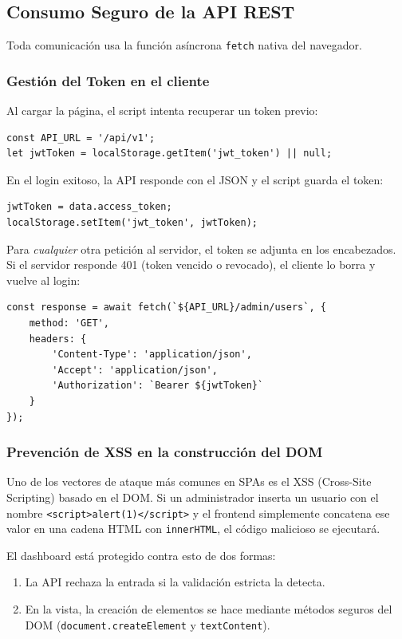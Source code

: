 \subsection{Consumo Seguro de la API REST}
Toda comunicación usa la función asíncrona \texttt{fetch} nativa del navegador.

\subsubsection{Gestión del Token en el cliente}
Al cargar la página, el script intenta recuperar un token previo:
\begin{lstlisting}[language={}, caption={Inicialización del token JWT}]
const API_URL = '/api/v1';
let jwtToken = localStorage.getItem('jwt_token') || null;
\end{lstlisting}
En el login exitoso, la API responde con el JSON y el script guarda el token:
\begin{lstlisting}[language={}, caption={Almacenamiento local del token}]
jwtToken = data.access_token;
localStorage.setItem('jwt_token', jwtToken);
\end{lstlisting}
Para \emph{cualquier} otra petición al servidor, el token se adjunta en los encabezados. Si el servidor responde 401 (token vencido o revocado), el cliente lo borra y vuelve al login:
\begin{lstlisting}[language={}, caption={Envío del token en la lectura de usuarios}]
const response = await fetch(`${API_URL}/admin/users`, {
    method: 'GET',
    headers: {
        'Content-Type': 'application/json',
        'Accept': 'application/json',
        'Authorization': `Bearer ${jwtToken}`
    }
});
\end{lstlisting}

\subsubsection{Prevención de XSS en la construcción del DOM}
Uno de los vectores de ataque más comunes en SPAs es el XSS (Cross-Site Scripting) basado en el DOM. Si un administrador inserta un usuario con el nombre \texttt{<script>alert(1)</script>} y el frontend simplemente concatena ese valor en una cadena HTML con \texttt{innerHTML}, el código malicioso se ejecutará.

El dashboard está protegido contra esto de dos formas:
\begin{enumerate}
    \item La API rechaza la entrada si la validación estricta la detecta.
    \item En la vista, la creación de elementos se hace mediante métodos seguros del DOM (\texttt{document.createElement} y \texttt{textContent}).
\end{enumerate}

